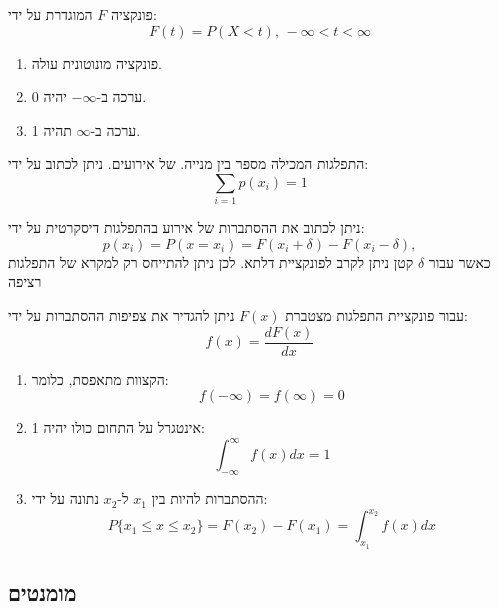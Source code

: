 \documentclass{tstextbook}
\begin{document}
\begin{definition}
פונקציה \(F\) המוגדרת על ידי:
$$F(t)=P(X<t),\,-\infty<t<\infty$$

\end{definition}
\begin{proposition}
  \begin{enumerate}
    \item פונקציה מונוטונית עולה. 


    \item ערכה ב-\(-\infty\) יהיה 0. 


    \item ערכה ב-\(\infty\) תהיה 1. 


  \end{enumerate}
\end{proposition}
\begin{definition}
התפלגות המכילה מספר בין מנייה. של אירועים. ניתן לכתוב על ידי:
$$\sum_{i=1}p(x_{i})=1$$

\end{definition}
\begin{proposition}
ניתן לכתוב את ההסתברות של אירוע בהתפלגות דיסקרטית על ידי:
$$p(x_{i})=P(x=x_{i})=F(x_{i}+\delta)-F(x_{i}-\delta),$$
כאשר עבור \(\delta\) קטן ניתן לקרב לפונקציית דלתא. לכן ניתן להתייחס רק למקרא של התפלגות רציפה

\end{proposition}
\begin{definition}
עבור פונקציית התפלגות מצטברת \(F(x)\) ניתן להגדיר את צפיפות ההסתברות על ידי:
$$f(x)=\frac{d F(x)}{d x}$$

\end{definition}
\begin{proposition}
  \begin{enumerate}
    \item הקצוות מתאפסת, כלומר: 
$$f(-\infty)=f(\infty)=0$$


    \item אינטגרל על התחום כולו יהיה 1: 
$$\int_{-\infty}^{\infty}f(x)d x=1$$


    \item ההסתברות להיות בין \(x_{1}\) ל-\(x_{2}\) נתונה על ידי: 
$$P\{x_{1}\leq x\leq x_{2}\}=F(x_{2})-F(x_{1})=\int_{x_{1}}^{x_{2}}f(x)d x$$


  \end{enumerate}
\end{proposition}
\subsection{מומנטים}
\end{document}
